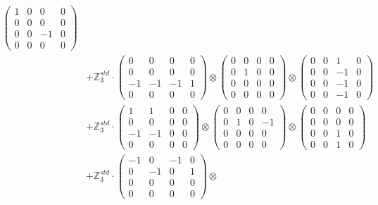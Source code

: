 \documentclass{article}
\begin{document}
{\begin{align}
            \begin{pmatrix} 1 & 0 & 0 & 0 \\ 0 & 0 & 0 & 0 \\ 0 & 0 & -1 & 0 \\ 0 & 0 & 0 & 0 \end{pmatrix} \\ 
        &+ \label{Rs1-Rc16-Solution-6-c15} \mathbb{Z}_3^{std} \cdot 
            \begin{pmatrix} 0 & 0 & 0 & 0 \\ 0 & 0 & 0 & 0 \\ -1 & -1 & -1 & 1 \\ 0 & 0 & 0 & 0 \end{pmatrix} \otimes 
            \begin{pmatrix} 0 & 0 & 0 & 0 \\ 0 & 1 & 0 & 0 \\ 0 & 0 & 0 & 0 \\ 0 & 0 & 0 & 0 \end{pmatrix} \otimes 
            \begin{pmatrix} 0 & 0 & 1 & 0 \\ 0 & 0 & -1 & 0 \\ 0 & 0 & -1 & 0 \\ 0 & 0 & -1 & 0 \end{pmatrix} \\ 
        &+ \label{Rs1-Rc16-Solution-6-c16} \mathbb{Z}_3^{std} \cdot 
            \begin{pmatrix} 1 & 1 & 0 & 0 \\ 0 & 0 & 0 & 0 \\ -1 & -1 & 0 & 0 \\ 0 & 0 & 0 & 0 \end{pmatrix} \otimes 
            \begin{pmatrix} 0 & 0 & 0 & 0 \\ 0 & 1 & 0 & -1 \\ 0 & 0 & 0 & 0 \\ 0 & 0 & 0 & 0 \end{pmatrix} \otimes 
            \begin{pmatrix} 0 & 0 & 0 & 0 \\ 0 & 0 & 0 & 0 \\ 0 & 0 & 1 & 0 \\ 0 & 0 & 1 & 0 \end{pmatrix} \\ 
        &+ \label{Rs1-Rc16-Solution-6-c17} \mathbb{Z}_3^{std} \cdot 
            \begin{pmatrix} -1 & 0 & -1 & 0 \\ 0 & -1 & 0 & 1 \\ 0 & 0 & 0 & 0 \\ 0 & 0 & 0 & 0 \end{pmatrix} \otimes 

\end{align}}
\end{document}
